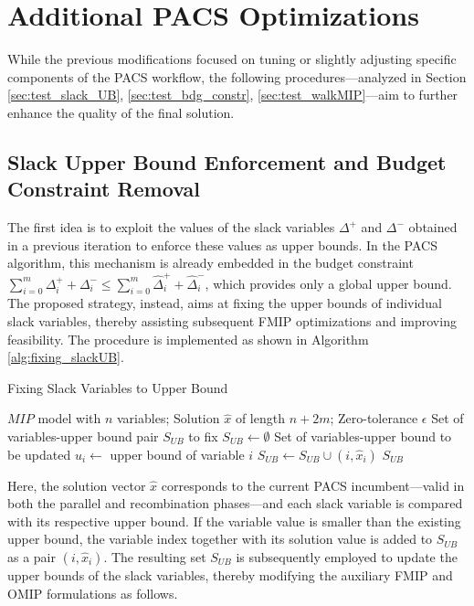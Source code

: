 \section{Additional PACS Optimizations}
While the previous modifications focused on tuning or slightly adjusting specific components of the PACS workflow, the following procedures—analyzed in Section \ref{sec:test_slack_UB}, \ref{sec:test_bdg_constr}, \ref{sec:test_walkMIP}—aim to further enhance the quality of the final solution.

\subsection{Slack Upper Bound Enforcement and Budget Constraint Removal}\label{sec:slack_UB_BDG_constr}
The first idea is to exploit the values of the slack variables $\Delta^+$ and $\Delta^-$ obtained in a previous iteration to enforce these values as upper bounds.  
In the PACS algorithm, this mechanism is already embedded in the budget constraint $\sum_{i=0}^m \Delta_i^{+}+\Delta_i^{-} \le \sum_{i=0}^m \hat\Delta_i^{+}+\hat\Delta_i^{-}$, which provides only a global upper bound. The proposed strategy, instead, aims at fixing the upper bounds of individual slack variables, thereby assisting subsequent FMIP optimizations and improving feasibility.  
The procedure is implemented as shown in Algorithm \ref{alg:fixing_slackUB}.  
\begin{algorithm}[H]
\caption{Fixing Slack Variables to Upper Bound}\label{alg:fixing_slackUB}
\begin{algorithmic}[1]
\Require $MIP$ model with $n$ variables; Solution $\hat{x}$ of length $n+2m$; Zero-tolerance $\epsilon$
\Ensure Set of variables-upper bound pair $S_{UB}$ to fix
    \State $S_{UB} \gets \emptyset$ \Comment Set of variables-upper bound to be updated
        \State $u_i \gets$ upper bound of variable $i$
            \State $S_{UB} \gets  S_{UB} \cup (i,\hat{x}_i)$
        \EndIf
    \EndFor
    \State \Return $S_{UB}$
\EndFunction
\end{algorithmic}
\end{algorithm}
Here, the solution vector $\hat{x}$ corresponds to the current PACS incumbent—valid in both the parallel and recombination phases—and each slack variable is compared with its respective upper bound. If the variable value is smaller than the existing upper bound, the variable index together with its solution value is added to $S_{UB}$ as a pair $(i, \hat{x}_i)$.
The resulting set $S_{UB}$ is subsequently employed to update the upper bounds of the slack variables, thereby modifying the auxiliary FMIP and OMIP formulations as follows.

